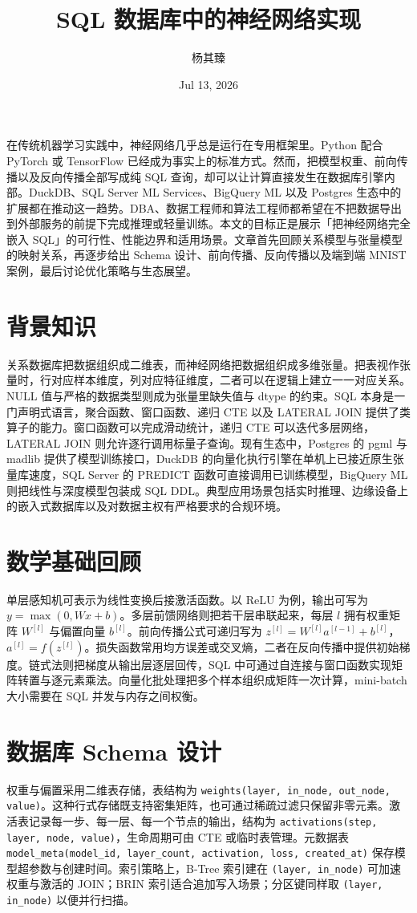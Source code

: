 \title{SQL 数据库中的神经网络实现}
\author{杨其臻}
\date{Jul 13, 2026}
\maketitle
在传统机器学习实践中，神经网络几乎总是运行在专用框架里。Python 配合 PyTorch 或 TensorFlow 已经成为事实上的标准方式。然而，把模型权重、前向传播以及反向传播全部写成纯 SQL 查询，却可以让计算直接发生在数据库引擎内部。DuckDB、SQL Server ML Services、BigQuery ML 以及 Postgres 生态中的扩展都在推动这一趋势。DBA、数据工程师和算法工程师都希望在不把数据导出到外部服务的前提下完成推理或轻量训练。本文的目标正是展示「把神经网络完全嵌入 SQL」的可行性、性能边界和适用场景。文章首先回顾关系模型与张量模型的映射关系，再逐步给出 Schema 设计、前向传播、反向传播以及端到端 MNIST 案例，最后讨论优化策略与生态展望。\par
\chapter{背景知识}
关系数据库把数据组织成二维表，而神经网络把数据组织成多维张量。把表视作张量时，行对应样本维度，列对应特征维度，二者可以在逻辑上建立一一对应关系。NULL 值与严格的数据类型则成为张量里缺失值与 dtype 的约束。SQL 本身是一门声明式语言，聚合函数、窗口函数、递归 CTE 以及 LATERAL JOIN 提供了类算子的能力。窗口函数可以完成滑动统计，递归 CTE 可以迭代多层网络，LATERAL JOIN 则允许逐行调用标量子查询。现有生态中，Postgres 的 pgml 与 madlib 提供了模型训练接口，DuckDB 的向量化执行引擎在单机上已接近原生张量库速度，SQL Server 的 PREDICT 函数可直接调用已训练模型，BigQuery ML 则把线性与深度模型包装成 SQL DDL。典型应用场景包括实时推理、边缘设备上的嵌入式数据库以及对数据主权有严格要求的合规环境。\par
\chapter{数学基础回顾}
单层感知机可表示为线性变换后接激活函数。以 ReLU 为例，输出可写为 $y = \max(0, Wx + b)$。多层前馈网络则把若干层串联起来，每层 $l$ 拥有权重矩阵 $W^{[l]}$ 与偏置向量 $b^{[l]}$。前向传播公式可递归写为 $z^{[l]} = W^{[l]} a^{[l-1]} + b^{[l]}$，$a^{[l]} = f(z^{[l]})$。损失函数常用均方误差或交叉熵，二者在反向传播中提供初始梯度。链式法则把梯度从输出层逐层回传，SQL 中可通过自连接与窗口函数实现矩阵转置与逐元素乘法。向量化批处理把多个样本组织成矩阵一次计算，mini-batch 大小需要在 SQL 并发与内存之间权衡。\par
\chapter{数据库 Schema 设计}
权重与偏置采用二维表存储，表结构为 \texttt{weights(layer, in\_{}node, out\_{}node, value)}。这种行式存储既支持密集矩阵，也可通过稀疏过滤只保留非零元素。激活表记录每一步、每一层、每一个节点的输出，结构为 \texttt{activations(step, layer, node, value)}，生命周期可由 CTE 或临时表管理。元数据表 \texttt{model\_{}meta(model\_{}id, layer\_{}count, activation, loss, created\_{}at)} 保存模型超参数与创建时间。索引策略上，B-Tree 索引建在 \texttt{(layer, in\_{}node)} 可加速权重与激活的 JOIN；BRIN 索引适合追加写入场景；分区键同样取 \texttt{(layer, in\_{}node)} 以便并行扫描。\par
